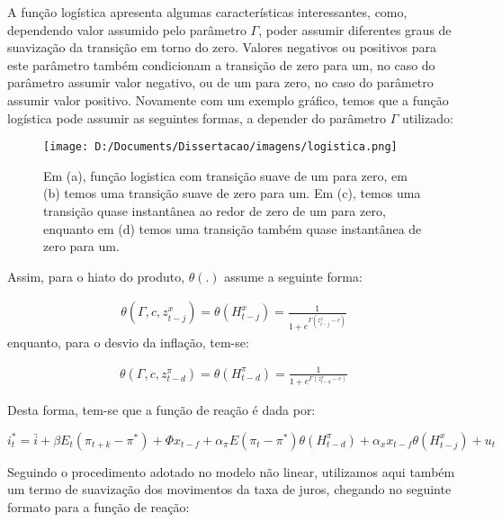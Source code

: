 \documentclass[
	article,			%
	11pt,				%
	oneside,			%
	a4paper,			%
	english,			%
	brazil,				%
	]{abntex2}
\begin{document}
	A função logística apresenta algumas características interessantes, como, dependendo valor assumido pelo parâmetro $\Gamma$, poder assumir diferentes graus de suavização da transição em torno do zero. Valores negativos ou positivos para este parâmetro também condicionam a transição de zero para um, no caso do parâmetro assumir valor negativo, ou de um para zero, no caso do parâmetro assumir valor positivo. Novamente com um exemplo gráfico, temos que a função logística pode assumir as seguintes formas, a depender do parâmetro $\Gamma$ utilizado:
	
	
	\hfill \break
	\hfill \break
	\hfill \break
	\hfill \break
	\hfill \break
	\hfill \break
	\hfill \break
	\hfill \break
	\hfill \break
	\hfill \break
	\hfill \break
	\hfill \break
	\hfill \break
	
	\begin{figure}[!h]
	\texttt{[image: D:/Documents/Dissertacao/imagens/logistica.png]}
	\caption{Em (a), função logistica com transição suave de um para zero, em (b) temos uma transição suave de zero para um. Em (c), temos uma transição quase instantânea ao redor de zero de um para zero, enquanto em (d) temos uma transição também quase instantânea de zero para um.}
	\label{fig:logistica}
	\end{figure}
	
	Assim, para o hiato do produto, $\theta(.)$ assume a seguinte forma:
	
	\begin{eqnarray}  \label{func_log_hiato}
		\theta (\Gamma,c,z_{t-j}^x) = \theta (H_{t-j}^x) = \frac{1}{1+e^{\Gamma (z_{t-j}^x - c)}} 
	\end{eqnarray}
	enquanto, para o desvio da inflação, tem-se:
	
	\begin{eqnarray}  \label{func_log_inflacao}
		\theta (\Gamma,c,z_{t-d}^\pi) = \theta (H_{t-d}^\pi) = \frac{1}{1+e^{\Gamma (z_{t-d}^\pi - c)}} 
	\end{eqnarray}
	
	Desta forma, tem-se que a função de reação é dada por:
	
	\begin{equation}
		i_t^* = \bar{i} + \beta E_t(\pi_{t+k} - \pi^*) + \Phi x_{t-f} + \alpha_\pi E(\pi_t - \pi^*)\theta(H_{t-d}^\pi) + \alpha_x x_{t-f} \theta (H_{t-j}^x) + u_t
	\end{equation}
	
	Seguindo o procedimento adotado no modelo não linear, utilizamos aqui também um termo de suavização dos movimentos da taxa de juros, chegando no seguinte formato para a função de reação:
	
\end{document}
